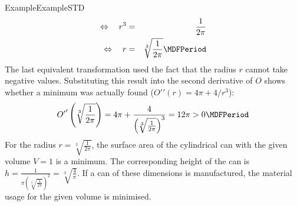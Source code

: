 \begin{MXContent}{Example}{Example}{STD}
\begin{eqnarray*}
\Leftrightarrow\quad r^3 &=& \frac{1}{2\pi}\\
\Leftrightarrow\quad r &=& \sqrt[3]{\frac{1}{2\pi}} \MDFPeriod
\end{eqnarray*}
%
The last equivalent transformation used the fact that the radius $r$ cannot take negative values. 
Substituting this result into the second derivative of $O$ shows whether a minimum was actually found 
(${O'}'(r) = 4\pi + 4/r^3$):
\begin{eqnarray*}
{O'}'\left(\sqrt[3]{\frac{1}{2\pi}}\right) = 4\pi + \frac{4}{\left(\sqrt[3]{\frac{1}{2\pi}}\right)^3} = 12\pi > 0 \MDFPeriod
\end{eqnarray*}
%
For the radius $r = \sqrt[3]{\frac{1}{2\pi}}$, the surface area of the cylindrical can with the given volume $V = 1$ is a
minimum. The corresponding height of the can is $h = \frac{1}{\pi \left(\sqrt[3]{\frac{1}{2\pi}}\right)^2} = \sqrt[3]{\frac{4}{\pi}}$.
If a can of these dimensions is manufactured, the material usage for the given volume is minimised.
\end{MXContent}


